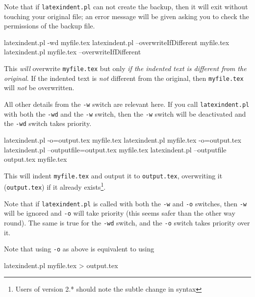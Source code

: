  Note that if \texttt{latexindent.pl} can not create the backup, then it will exit without
 touching your original file; an error message will be given asking you to check the
 permissions of the backup file.

 \begin{commandshell}
latexindent.pl -wd myfile.tex
latexindent.pl --overwriteIfDifferent myfile.tex
latexindent.pl myfile.tex --overwriteIfDifferent
\end{commandshell}

 This \emph{will} overwrite \texttt{myfile.tex} but only \emph{if the indented text is
 different from the original}. If the indented text is \emph{not} different from the
 original, then \texttt{myfile.tex} will \emph{not} be overwritten.

 All other details from the \texttt{-w} switch are relevant here. If you call
 \texttt{latexindent.pl} with both the \texttt{-wd} and the \texttt{-w} switch, then the
 \texttt{-w} switch will be deactivated and the \texttt{-wd} switch takes priority.

 \begin{commandshell} 
latexindent.pl -o=output.tex myfile.tex
latexindent.pl myfile.tex -o=output.tex 
latexindent.pl --outputfile=output.tex myfile.tex
latexindent.pl --outputfile output.tex myfile.tex
\end{commandshell}

 This will indent \texttt{myfile.tex} and output it to \texttt{output.tex}, overwriting it
 (\texttt{output.tex}) if it already exists\footnote{Users of version 2.* should note the
 subtle change in syntax}.

 Note that if \texttt{latexindent.pl} is called with both the \texttt{-w} and \texttt{-o}
 switches, then \texttt{-w} will be ignored and \texttt{-o} will take priority (this seems
 safer than the other way round). The same is true for the \texttt{-wd} switch, and the
 \texttt{-o} switch takes priority over it.

 Note that using \texttt{-o} as above is equivalent to using
 \begin{commandshell}
latexindent.pl myfile.tex > output.tex
\end{commandshell}

